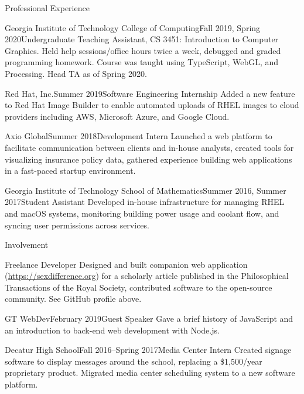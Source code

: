 \documentclass[hidelinks]{resume}
\begin{document}
\begin{rSection}{Professional Experience}
	\begin{rSubsection}{Georgia Institute of Technology College of Computing}{Fall 2019, Spring 2020}{Undergraduate Teaching Assistant, CS 3451: Introduction to Computer Graphics. }{}
		Held help sessions/office hours twice a week, debugged and graded programming homework. Course was taught using TypeScript, WebGL, and Processing. Head TA as of Spring 2020.
	\end{rSubsection}
	\begin{rSubsection}{Red Hat, Inc.}{Summer 2019}{Software Engineering Internship}{}
		Added a new feature to Red Hat Image Builder to enable automated uploads of RHEL images to cloud providers including AWS, Microsoft Azure, and Google Cloud.
	\end{rSubsection}
	\begin{rSubsection}{Axio Global}{Summer 2018}{Development Intern}{}
		Launched a web platform to facilitate communication between clients and in-house analysts, created tools for visualizing insurance policy data, gathered experience building web applications in a fast-paced startup environment.
	\end{rSubsection}
	\begin{rSubsection}{Georgia Institute of Technology School of Mathematics}{Summer 2016, Summer 2017}{Student Assistant}{}
		Developed in-house infrastructure for managing RHEL and macOS systems, monitoring building power usage and coolant flow, and syncing user permissions across services.
	\end{rSubsection}
\end{rSection}

\begin{rSection}{Involvement}
	\begin{rSubsection}{Freelance Developer}{}{}{}
		Designed and built companion web application (\url{https://sexdifference.org}) for a scholarly article published in the Philosophical Transactions of the Royal Society, contributed software to the open-source community. See GitHub profile above.
	\end{rSubsection}
	\begin{rSubsection}{GT WebDev}{February 2019}{Guest Speaker}{}
		Gave a brief history of JavaScript and an introduction to back-end web development with Node.js.
	\end{rSubsection}
	\begin{rSubsection}{Decatur High School}{Fall 2016--Spring 2017}{Media Center Intern}{}
		Created signage software to display messages around the school, replacing a \$1,500/year proprietary product. Migrated media center scheduling system to a new software platform.
	\end{rSubsection}
\end{rSection}
\end{document}
